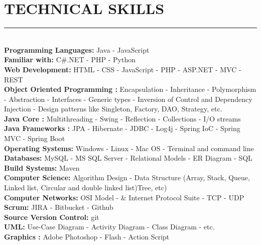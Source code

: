 \documentclass[10pt,a4paper]{article}
\begin{document}
\section{TECHNICAL SKILLS}
\noindent \rule {18.0cm}{0.2pt} \\
\noindent
\textbullet \hspace{0.1cm}\textbf{Programming Languages:} Java - JavaScript \\
\textbullet \hspace{0.1cm}\textbf{Familiar with:} C\#.NET - PHP - Python \\
\textbullet \hspace{0.1cm}\textbf{Web Development:} HTML - CSS - JavaScript - PHP - ASP.NET - MVC - REST \\
\textbullet \hspace{0.1cm}\textbf{Object Oriented Programming :} Encapsulation - Inheritance - Polymorphism - Abstraction - Interfaces - Generic types - Inversion of Control and Dependency Injection - Design patterns like Singleton, Factory, DAO, Strategy, etc.\\
\textbullet \hspace{0.1cm}\textbf{Java Core :} Multithreading - Swing - Reflection - Collections - I/O streams \\
\textbullet \hspace{0.1cm}\textbf{Java Frameworks :} JPA - Hibernate - JDBC - Log4j - Spring IoC - Spring MVC - Spring Boot \\
\textbullet \hspace{0.1cm}\textbf{Operating Systems:} Windows - Linux - Mac OS - Terminal and command line \\
\textbullet \hspace{0.1cm}\textbf{Databases:} MySQL - MS SQL Server - Relational Models - ER Diagram - SQL \\
\textbullet \hspace{0.1cm}\textbf{Build Systems:} Maven \\
\textbullet \hspace{0.1cm}\textbf{Computer Science:} Algorithm Design - Data Structure (Array, Stack, Queue, Linked list, Circular and double linked list)Tree, etc) \\
\textbullet \hspace{0.1cm}\textbf{Computer Networks:} OSI Model - \& Internet Protocol Suite - TCP - UDP \\
\textbullet \hspace{0.1cm}\textbf{Scrum:} JIRA - Bitbucket - Github \\
\textbullet \hspace{0.1cm}\textbf{Source Version Control:} git \\
\textbullet \hspace{0.1cm}\textbf{UML:} Use-Case Diagram - Activity Diagram - Class Diagram - etc. \\
\textbullet \hspace{0.1cm}\textbf{Graphics :} Adobe Photoshop - Flash - Action Script
\end{document}
